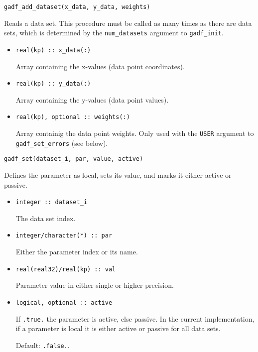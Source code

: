 \documentclass{article}
\begin{document}
\begin{verbatim}
gadf_add_dataset(x_data, y_data, weights)
\end{verbatim}
Reads a data set. This procedure must be called as many times as there are data sets, which is determined by the \verb+num_datasets+ argument to \verb+gadf_init+.
\begin{itemize}
\item
\begin{verbatim}
real(kp) :: x_data(:)
\end{verbatim}
  Array containing the x-values (data point coordinates).
\item
\begin{verbatim}
real(kp) :: y_data(:)
\end{verbatim}
  Array containing the y-values (data point values).
\item
\begin{verbatim}
real(kp), optional :: weights(:)
\end{verbatim}
  Array containig the data point weights. Only used with the \texttt{USER} argument to \verb+gadf_set_errors+ (see below).
\end{itemize}

\begin{verbatim}
gadf_set(dataset_i, par, value, active)
\end{verbatim}
Defines the parameter as local, sets its value, and marks it either active or passive.
\begin{itemize}
\item
\begin{verbatim}
integer :: dataset_i
\end{verbatim}
  The data set index.
\item
\begin{verbatim}
integer/character(*) :: par
\end{verbatim}
  Either the parameter index or its name.
\item
\begin{verbatim}
real(real32)/real(kp) :: val
\end{verbatim}
  Parameter value in either single or higher precision.
\item
\begin{verbatim}
logical, optional :: active
\end{verbatim}
  If \verb+.true.+ the parameter is active, else passive. In the current implementation, if a parameter is local it is either active or passive for all data sets.

  Default: \verb+.false.+.
\end{itemize}
\end{document}
